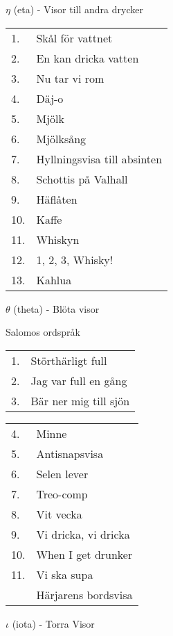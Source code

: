 \documentclass[a6paper,10pt]{article}
\begin{document}
\noindent \Large $\eta$ (eta) - Visor till andra drycker

\normalsize
\noindent
\begin{tabularx}{1\textwidth}{l X}
1.&Skål för vattnet\\
2.&En kan dricka vatten\\
3.&Nu tar vi rom\\
4.&Däj-o\\
5.&Mjölk\\
6.&Mjölksång\\
7.&Hyllningsvisa till absinten\\
8.&Schottis på Valhall\\
9.&Häflåten\\
10.&Kaffe\\
11.&Whiskyn\\
12.&1, 2, 3, Whisky!\\
13.&Kahlua
\end{tabularx}

\vspace{5pt}

\noindent \Large $\theta$ (theta) - Blöta visor

\noindent \normalsize Salomos ordspråk

\vspace{5pt}

\noindent
\begin{tabularx}{1\textwidth}{l X}
1.&Störthärligt full\\
2.&Jag var full en gång\\
3.&Bär ner mig till sjön
\end{tabularx}

\noindent
\begin{tabularx}{1\textwidth}{l X}
4.&Minne\\
5.&Antisnapsvisa\\
6.&Selen lever\\
7.&Treo-comp\\
8.&Vit vecka\\
9.&Vi dricka, vi dricka\\
10.&When I get drunker\\
11.&Vi ska supa\\
&Härjarens bordsvisa\\
\end{tabularx}

\vspace{5pt}

\noindent \Large $\iota$ (iota) - Torra Visor
\end{document}
